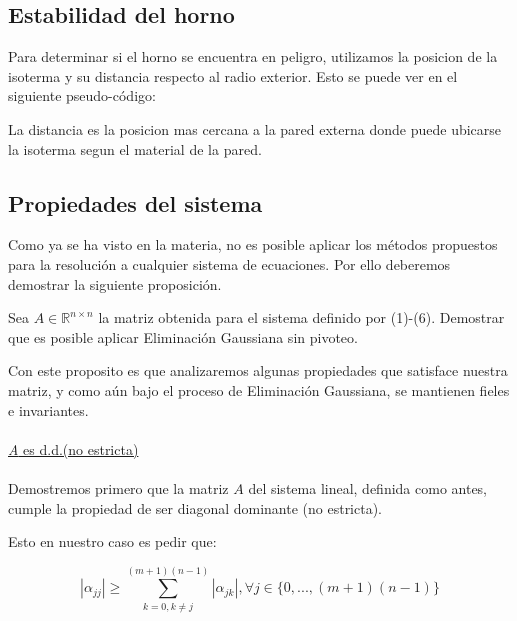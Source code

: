 \subsection{Estabilidad del horno}

Para determinar si el horno se encuentra en peligro, utilizamos la posicion de la isoterma y su distancia respecto al radio exterior. Esto se puede ver en el siguiente pseudo-código:

\begin{algorithmic}
		\State {}
	\EndIf
\EndFor
{}
\EndProcedure
\end{algorithmic}

La distancia es la posicion mas cercana a la pared externa donde puede ubicarse la isoterma segun el material de la pared.

\subsection{Propiedades del sistema}
Como ya se ha visto en la materia, no es posible aplicar los métodos propuestos para la resoluci\'on a cualquier sistema de ecuaciones. Por ello deberemos demostrar la siguiente proposici\'on.

\begin{proposition}
Sea $A \in \mathbb{R}^{n \times n}$ la matriz obtenida para el sistema definido por (1)-(6). Demostrar que es posible
aplicar Eliminaci\'on Gaussiana sin pivoteo.
\end{proposition}

Con este proposito es que analizaremos algunas propiedades que satisface nuestra matriz, y como a\'un bajo el proceso de Eliminaci\'on Gaussiana, se mantienen fieles e invariantes.
\\
\\
\underline{\textit{A} es d.d.(no estricta)}
\\
\\
Demostremos primero que la matriz $A$ del sistema lineal, definida como antes, cumple la propiedad de ser diagonal dominante (no estricta).

Esto en nuestro caso es pedir que:

\begin{equation}
 \left | \alpha_{jj} \right | \geq \sum_{k=0,k \neq j}^{(m+1)(n-1)} \left | \alpha_{jk} \right |, \forall j \in \{ 0,...,(m+1)(n-1)\}
\end{equation}

